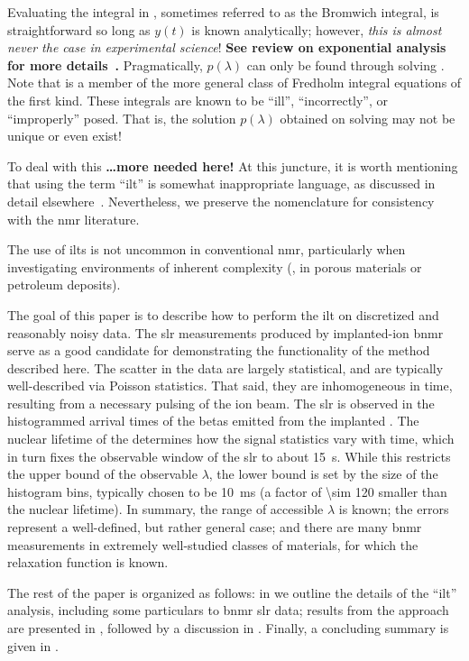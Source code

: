 Evaluating the integral in , sometimes referred to as the Bromwich integral, is straightforward so long as $y(t)$ is known analytically;
however, \emph{this is almost never the case in experimental science}!
\textbf{See review on exponential analysis for more details~\cite{1999-Istratov-RSI-70-1233}.}
Pragmatically, $p ( \lambda )$ can only be found through solving .
Note that  is a member of the more general class of Fredholm integral equations of the first kind.
These integrals are known to be ``ill'', ``incorrectly'', or ``improperly'' posed.
That is, the solution $p ( \lambda )$ obtained on solving  may not be unique or even exist!

To deal with this \textbf{\dots more needed here!}
At this juncture, it is worth mentioning that using the term ``\gls{ilt}'' is somewhat inappropriate language, as discussed in detail elsewhere~\cite{2017-Fordham-DF-29-2}.
Nevertheless, we preserve the nomenclature for consistency with the \gls{nmr} literature.



The use of \glspl{ilt} is not uncommon in conventional \gls{nmr}, particularly when investigating environments of inherent complexity (, in porous materials or petroleum deposits).





The goal of this paper is to describe how to perform the \gls{ilt} on discretized and reasonably noisy data. The \gls{slr} measurements produced by implanted-ion \gls{bnmr} serve as a good candidate for demonstrating the functionality of the method described here. The scatter in the data are largely statistical, and are typically well-described via Poisson statistics. That said, they are inhomogeneous in time, resulting from a necessary pulsing of the ion beam. The \gls{slr} is observed in the histogrammed arrival times of the betas emitted from the implanted . The nuclear lifetime of the  determines how the signal statistics vary with time, which in turn fixes the observable window of the \gls{slr} to about \SI{15}{\s}. While this restricts the upper bound of the observable $\lambda$, the lower bound is set by the size of the histogram bins, typically chosen to be \SI{10}{\milli\second} (a factor of \num{\sim 120} smaller than the nuclear lifetime). In summary, the range of accessible $\lambda$ is known; the errors represent a well-defined, but rather general case; and there are many \gls{bnmr} measurements in extremely well-studied classes of materials, for which the relaxation function is known. 

The rest of the paper is organized as follows:
in  we outline the details of the ``\gls{ilt}'' analysis, including some particulars to \gls{bnmr} \gls{slr} data;
results from the approach are presented in ,
followed by a discussion in .
Finally, a concluding summary is given in .

